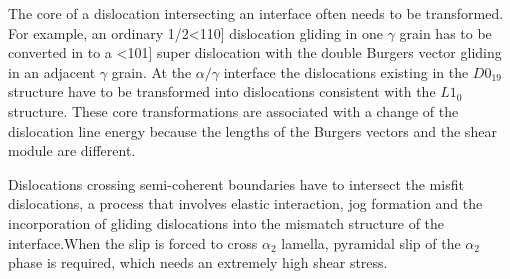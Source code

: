 \documentclass[journal,article,submit,moreauthors,pdftex,10pt,a4paper]{Definitions/mdpi}
\begin{document}
The core of  a dislocation intersecting an interface often needs to be transformed. For example, an ordinary 1/2<110] dislocation gliding in one $\gamma$ grain has to be converted in to a <101] super dislocation with the double Burgers vector gliding in an adjacent $\gamma$ grain. At the $\alpha/\gamma$ interface the dislocations existing in the $D0_{19}$ structure have to be transformed into dislocations consistent with the $L1_0$structure. These core transformations are associated with a change of the dislocation line energy because the lengths of the Burgers vectors and the shear module are different.
	
Dislocations crossing semi-coherent boundaries have to intersect the misfit dislocations, a process that involves elastic interaction, jog formation and the incorporation of gliding dislocations into the mismatch structure of the interface.When the slip is forced to cross $\alpha_2$ lamella, pyramidal slip of the $\alpha_2$ phase is required, which needs an extremely high shear stress.
	
	
	
	 
\end{document}

